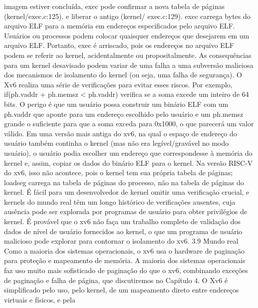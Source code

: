 imagem  estiver  concluída,  exec  pode  confirmar  a  nova  tabela  de  páginas  (kernel/exec.c:125).  e  liberar  o  antigo  (kernel/
 exec.c:129).
 exec  carrega  bytes  do  arquivo  ELF  para  a  memória  em  endereços  especificados  pelo  arquivo  ELF.  Usuários  ou  
processos  podem  colocar  quaisquer  endereços  que  desejarem  em  um  arquivo  ELF.  Portanto,  exec  é  arriscado,  pois  os  
endereços  no  arquivo  ELF  podem  se  referir  ao  kernel,  acidentalmente  ou  propositalmente.  As  consequências  para  um  
kernel  desavisado  podem  variar  de  uma  falha  a  uma  subversão  maliciosa  dos  mecanismos  de  isolamento  do  kernel  (ou  
seja,  uma  falha  de  segurança).  O  Xv6  realiza  uma  série  de  verificações  para  evitar  esses  riscos.  Por  exemplo,  if(ph.vaddr  
+  ph.memsz  <  ph.vaddr)  verifica  se  a  soma  excede  um  inteiro  de  64  bits.  O  perigo  é  que  um  usuário  possa  construir  um  
binário  ELF  com  um  ph.vaddr  que  aponte  para  um  endereço  escolhido  pelo  usuário  e  um  ph.memsz  grande  o  suficiente  
para  que  a  soma  exceda  para  0x1000,  o  que  parecerá  um  valor  válido.  Em  uma  versão  mais  antiga  do  xv6,  na  qual  o  
espaço  de  endereço  do  usuário  também  continha  o  kernel  (mas  não  era  legível/gravável  no  modo  usuário),  o  usuário  podia  
escolher  um  endereço  que  correspondesse  à  memória  do  kernel  e,  assim,  copiar  os  dados  do  binário  ELF  para  o  kernel.  
Na  versão  RISC-V  do  xv6,  isso  não  acontece,  pois  o  kernel  tem  sua  própria  tabela  de  páginas;  loadseg  carrega  na  tabela  
de  páginas  do  processo,  não  na  tabela  de  páginas  do  kernel.
 É  fácil  para  um  desenvolvedor  de  kernel  omitir  uma  verificação  crucial,  e  kernels  do  mundo  real  têm  um  longo  histórico  
de  verificações  ausentes,  cuja  ausência  pode  ser  explorada  por  programas  de  usuário  para  obter  privilégios  de  kernel.  É  
provável  que  o  xv6  não  faça  um  trabalho  completo  de  validação  dos  dados  de  nível  de  usuário  fornecidos  ao  kernel,  o  que  
um  programa  de  usuário  malicioso  pode  explorar  para  contornar  o  isolamento  do  xv6.
 3.9  Mundo  real
 Como  a  maioria  dos  sistemas  operacionais,  o  xv6  usa  o  hardware  de  paginação  para  proteção  e  mapeamento  de  memória.
 A  maioria  dos  sistemas  operacionais  faz  uso  muito  mais  sofisticado  de  paginação  do  que  o  xv6,  combinando  exceções  de  
paginação  e  falha  de  página,  que  discutiremos  no  Capítulo  4.
 O  Xv6  é  simplificado  pelo  uso,  pelo  kernel,  de  um  mapeamento  direto  entre  endereços  virtuais  e  físicos,  e  pela  
